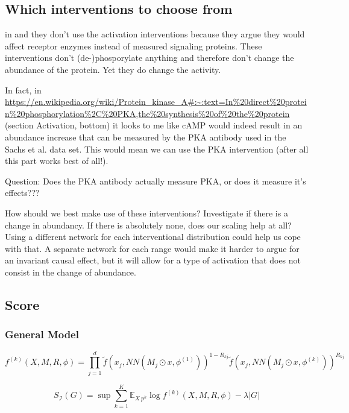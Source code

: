 \documentclass{article}
\begin{document}
\subsection{Which interventions to choose from}
in \cite{} and \cite{} they don't use the activation interventions because they argue they would affect receptor enzymes instead of measured signaling proteins. These interventions don't (de-)phosporylate anything and therefore don't change the abundance of the protein. Yet they do change the activity.

In fact, in \url{https://en.wikipedia.org/wiki/Protein_kinase_A#:~:text=In%20direct%20protein%20phosphorylation%2C%20PKA,the%20synthesis%20of%20the%20protein} (section Activation, bottom) it looks to me like cAMP would indeed result in an abundance increase that can be measured by the PKA antibody used in the Sachs et al. data set. This would mean we can use the PKA intervention (after all this part works best of all!).

Question: Does the PKA antibody actually measure PKA, or does it measure it's effects???

How should we best make use of these interventions? Investigate if there is a change in abundancy. If there is absolutely none, does our scaling help at all?
Using a different network for each interventional distribution could help us cope with that. A separate network for each range would make it harder to argue for an invariant causal effect, but it will allow for a type of activation that does not consist in the change of abundance.

\subsection{Score}

    

\subsubsection{General Model}
\begin{equation}
    f^{(k)}(X, M, R, \phi) = \prod_{j=1}^{d} \tilde{f}(x_j, NN(M_j \odot x, \phi^{(1)}))^{1-R_{kj}} \tilde{f}(x_j, NN(M_j \odot x, \phi^{(k)}))^{R_{kj}}
\end{equation}

\begin{equation}
    S_{\mathcal{I}}(G) = \sup \sum_{k=1}^K \mathbb{E}_{X ~ p^{k}} \log f^{(k)}(X, M, R, \phi) - \lambda |G|
\end{equation}
\end{document}
